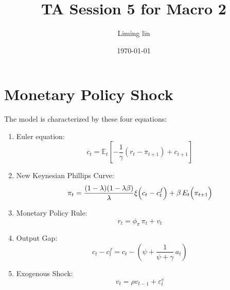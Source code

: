 \documentclass[12pt]{article}
\title{TA Session 5 for Macro 2}
\author{Liming lin}
\date{\today}
\begin{document}
\maketitle


\section{Monetary Policy Shock}
The model is characterized by these four equations:
\begin{enumerate}
    \item Euler equation:\\
    \begin{equation}
        c_t = \mathbb{E}_t[-\frac{1}{\gamma}(r_t-\pi_{t+1})+c_{t+1}]
    \end{equation}
    \item New Keynesian Phillips Curve:\\
    \begin{equation}
        \pi_t = \frac{(1-\lambda)(1-\lambda\beta)}{\lambda}\xi\Bigl(c_t - c_t^f\Bigr) + \beta\,E_t\Bigl(\pi_{t+1}\Bigr)
    \end{equation}
    \item Monetary Policy Rule:\\
    \begin{equation}
        r_t = \phi_\pi\,\pi_t + v_t
    \end{equation}
    \item Output Gap:\\
    \begin{equation}
        c_t - c_t^f = c_t - \left(\psi + \frac{1}{\psi+\gamma}\,a_t\right)
    \end{equation}
    \item Exogenous Shock:\\
    \begin{equation}
        v_t = \rho v_{t-1} + \varepsilon_t^v
    \end{equation}
\end{enumerate}
\end{document}

